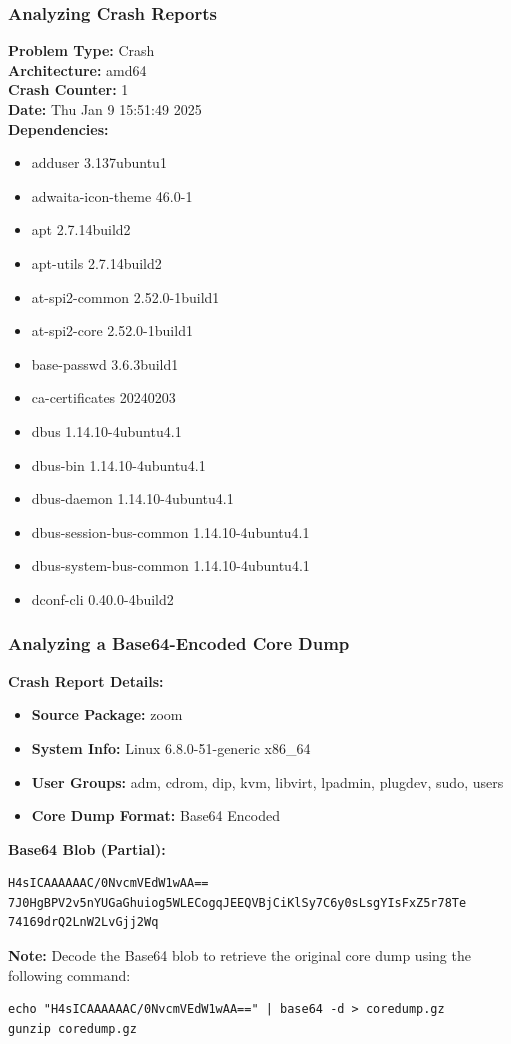 \begin{frame}[fragile]
\frametitle{Analyzing Crash Reports}

\textbf{Problem Type:} Crash \\
\textbf{Architecture:} amd64 \\
\textbf{Crash Counter:} 1 \\
\textbf{Date:} Thu Jan 9 15:51:49 2025 \\

\textbf{Dependencies:}
\begin{itemize}
    \item adduser 3.137ubuntu1
    \item adwaita-icon-theme 46.0-1
    \item apt 2.7.14build2
    \item apt-utils 2.7.14build2
    \item at-spi2-common 2.52.0-1build1
    \item at-spi2-core 2.52.0-1build1
    \item base-passwd 3.6.3build1
    \item ca-certificates 20240203
    \item dbus 1.14.10-4ubuntu4.1
    \item dbus-bin 1.14.10-4ubuntu4.1
    \item dbus-daemon 1.14.10-4ubuntu4.1
    \item dbus-session-bus-common 1.14.10-4ubuntu4.1
    \item dbus-system-bus-common 1.14.10-4ubuntu4.1
    \item dconf-cli 0.40.0-4build2
\end{itemize}

\end{frame}

\begin{frame}[fragile]
\frametitle{Analyzing a Base64-Encoded Core Dump}

\textbf{Crash Report Details:}
\begin{itemize}
    \item \textbf{Source Package:} zoom
    \item \textbf{System Info:} Linux 6.8.0-51-generic x86\_64
    \item \textbf{User Groups:} adm, cdrom, dip, kvm, libvirt, lpadmin, plugdev, sudo, users
    \item \textbf{Core Dump Format:} Base64 Encoded
\end{itemize}

\textbf{Base64 Blob (Partial):}
\begin{verbatim}
H4sICAAAAAAC/0NvcmVEdW1wAA==
7J0HgBPV2v5nYUGaGhuiog5WLECogqJEEQVBjCiKlSy7C6y0sLsgYIsFxZ5r78Te
74169drQ2LnW2LvGjj2Wq
\end{verbatim}

\textbf{Note:} Decode the Base64 blob to retrieve the original core dump using the following command:
\begin{verbatim}
echo "H4sICAAAAAAC/0NvcmVEdW1wAA==" | base64 -d > coredump.gz
gunzip coredump.gz
\end{verbatim}

\end{frame}

